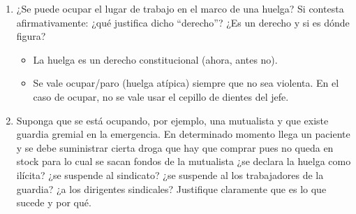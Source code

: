 \documentclass[spanish,12pt,a4paper,titlepage]{report}
\begin{document}
\begin{enumerate}
\begin{itemize}
  \item Hay típicas (parar la fábrica) y atípicas (parciales, piquete, etc)
  \item Puede ser política, si va contra el gobierno.
  \item \textbf{NO} existe otro instrumento que sustituya a la huelga. Es fundamental, ya que sino el sindicato no tendría poder (se puede quejar, pero no tiene huevo)
  \item Medio de solución del conflicto entre el sindicato y el patrón.
  \item No puede durar para siempre, y no es de interés.
  \item Puede ser con o sin cesación de trabajo.
  \item Tipos:
    \begin{itemize}
    \item Sorpresivo.
    \item Parcial (algunos sectores)
    \item Neurálgica \footnote{Ta(m)pón} :deja de trabajar el que abre la puerta, y nadie puede entrar.
    \item De brazos caídos: Arrastraje testicular.
    \item Tortugismo: no hacer cosas que no son obligatorias, pero normalmente se hacen (horas extras, etc)
    \item Activa: Laburar como un demente.
    \end{itemize}
  \end{itemize}
\item ¿Se puede ocupar el lugar de trabajo en el marco de una huelga? Si contesta afirmativamente: ¿qué justifica dicho ``derecho''? ¿Es un derecho y si es dónde figura?
  \begin{itemize}
  \item La huelga es un derecho constitucional (ahora, antes no).
  \item Se vale ocupar/paro (huelga atípica) siempre que no sea violenta. En el caso de ocupar, no se vale usar el cepillo de dientes del jefe.
  \end{itemize}
\item Suponga que se está ocupando, por ejemplo, una mutualista y que existe guardia gremial en la emergencia. En determinado momento llega un paciente y se debe suministrar cierta droga que hay que comprar pues no queda en stock para lo cual se sacan fondos de la mutualista ¿se declara la huelga como ilícita? ¿se suspende al sindicato? ¿se suspende al los trabajadores de la guardia? ¿a los dirigentes sindicales? Justifique claramente que es lo que sucede y por qué.
  

\end{enumerate}
\end{document}
